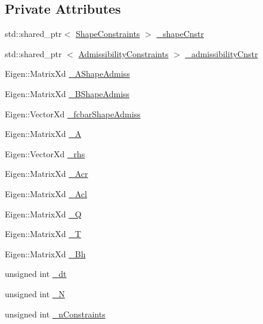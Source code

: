 \subsection*{\-Private \-Attributes}
\begin{DoxyCompactItemize}
\item 
std\-::shared\-\_\-ptr$<$ \hyperlink{classShapeConstraints}{\-Shape\-Constraints} $>$ \hyperlink{classMIQPLinearConstraints_a5c8788e52f7b0664606662cfa758ae88}{\-\_\-shape\-Cnstr}
\item 
std\-::shared\-\_\-ptr\*
$<$ \hyperlink{classAdmissibilityConstraints}{\-Admissibility\-Constraints} $>$ \hyperlink{classMIQPLinearConstraints_a1ac00fe6aca254b4dd8568e199bd20a4}{\-\_\-admissibility\-Cnstr}
\item 
\-Eigen\-::\-Matrix\-Xd \hyperlink{classMIQPLinearConstraints_a7ff7b3584cf9ff3e2124d80bd0684180}{\-\_\-\-A\-Shape\-Admiss}
\item 
\-Eigen\-::\-Matrix\-Xd \hyperlink{classMIQPLinearConstraints_ab3ea8be40c22fa7d8035c7b5c5c1010c}{\-\_\-\-B\-Shape\-Admiss}
\item 
\-Eigen\-::\-Vector\-Xd \hyperlink{classMIQPLinearConstraints_a4e1cac634590c04e81d9b9341088efeb}{\-\_\-fcbar\-Shape\-Admiss}
\item 
\-Eigen\-::\-Matrix\-Xd \hyperlink{classMIQPLinearConstraints_a5dfdc7553c4cbbe75ac54b34c4f29732}{\-\_\-\-A}
\item 
\-Eigen\-::\-Vector\-Xd \hyperlink{classMIQPLinearConstraints_ac8df74075c393100f5bddcb371503530}{\-\_\-rhs}
\item 
\-Eigen\-::\-Matrix\-Xd \hyperlink{classMIQPLinearConstraints_a26250a3f878cdacc0fa0c5ccf04d0bed}{\-\_\-\-Acr}
\item 
\-Eigen\-::\-Matrix\-Xd \hyperlink{classMIQPLinearConstraints_a100ca667cae697cda19ae4aef3543120}{\-\_\-\-Acl}
\item 
\-Eigen\-::\-Matrix\-Xd \hyperlink{classMIQPLinearConstraints_afecaf6e02135bfba45045fab6cce3511}{\-\_\-\-Q}
\item 
\-Eigen\-::\-Matrix\-Xd \hyperlink{classMIQPLinearConstraints_a5e6d37521f3da248b19ff424526d700a}{\-\_\-\-T}
\item 
\-Eigen\-::\-Matrix\-Xd \hyperlink{classMIQPLinearConstraints_a0c0fbbb1b86c5d51a133ee661977c1f5}{\-\_\-\-Bh}
\item 
unsigned int \hyperlink{classMIQPLinearConstraints_a403b0a1f684bda20236a759bd72950f2}{\-\_\-dt}
\item 
unsigned int \hyperlink{classMIQPLinearConstraints_a1edaf84d613dde3f86fd9e78aa14a077}{\-\_\-\-N}
\item 
unsigned int \hyperlink{classMIQPLinearConstraints_a2726424eb890fe556ce503096b418d0f}{\-\_\-n\-Constraints}
\end{DoxyCompactItemize}


